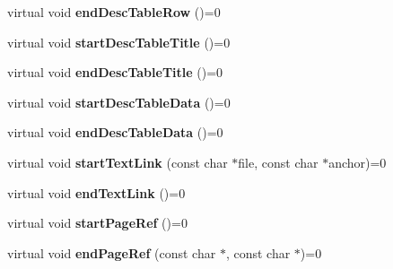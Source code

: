 \begin{DoxyCompactItemize}
\item 
\mbox{\label{class_base_output_doc_interface_ab90efab0f38bbced65583c5e1840c545}} 
virtual void {\bfseries end\+Desc\+Table\+Row} ()=0
\item 
\mbox{\label{class_base_output_doc_interface_a2a026821caecc0397f2c21fd1a1de095}} 
virtual void {\bfseries start\+Desc\+Table\+Title} ()=0
\item 
\mbox{\label{class_base_output_doc_interface_a1106996c286d637c873c819adc5072ba}} 
virtual void {\bfseries end\+Desc\+Table\+Title} ()=0
\item 
\mbox{\label{class_base_output_doc_interface_ae9e8390997be56f776e966c0f906483d}} 
virtual void {\bfseries start\+Desc\+Table\+Data} ()=0
\item 
\mbox{\label{class_base_output_doc_interface_a7448492f455ed3dbff7dbedc00bb7be2}} 
virtual void {\bfseries end\+Desc\+Table\+Data} ()=0
\item 
\mbox{\label{class_base_output_doc_interface_af3e8e537c3a2379071c3573d25a64d03}} 
virtual void {\bfseries start\+Text\+Link} (const char $\ast$file, const char $\ast$anchor)=0
\item 
\mbox{\label{class_base_output_doc_interface_a5b584fb5f7e3d9747c78a4e13715340a}} 
virtual void {\bfseries end\+Text\+Link} ()=0
\item 
\mbox{\label{class_base_output_doc_interface_add686ba33132cc455a70356c77416994}} 
virtual void {\bfseries start\+Page\+Ref} ()=0
\item 
\mbox{\label{class_base_output_doc_interface_a292c5c481f4ba85ab7957bb4b8979d97}} 
virtual void {\bfseries end\+Page\+Ref} (const char $\ast$, const char $\ast$)=0
\item 
\mbox{\label{class_base_output_doc_interface_ab2c4106db654fb639aaca243d3f4a686}} 

\end{DoxyCompactItemize}
